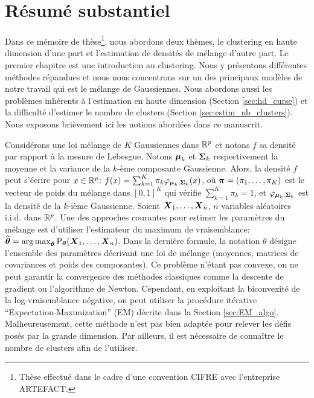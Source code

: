 \chapter*{Résumé substantiel}

Dans ce mémoire de thèse\footnote{Thèse effectué dans le cadre d'une convention CIFRE avec l'entreprise ARTEFACT.}, nous abordons deux thèmes, le clustering en haute dimension d'une part et l'estimation de densités de mélange d'autre part. Le premier chapitre est une introduction au clustering. Nous y présentons différentes méthodes répandues et nous nous concentrons sur un des principaux modèles de notre travail qui est le mélange de Gaussiennes. Nous abordons aussi les problèmes inhérents à l'estimation en haute dimension (Section \ref{sec:hd_curse}) et la difficulté d'estimer le nombre de clusters (Section \ref{sec:estim_nb_clusters}).  Nous exposons brièvement ici les notions abordées dans ce manuscrit.

Considérons une loi mélange de $K$ Gaussiennes dans ${\mathbb R}^p$ et notons $f$ sa densité par rapport à la mesure de Lebesgue. Notons $\boldsymbol\mu_k$ et $\boldsymbol\Sigma_k$ respectivement la moyenne et la variance de la $k$-ème composante Gaussienne. Alors, la densité $f$ peut s'écrire pour $x\in{\mathbb R}^p$: $f(x)= \sum_{k=1}^K\pi_k\varphi_{\boldsymbol\mu_k,\boldsymbol\Sigma_k}(x)$, où $\boldsymbol \pi=(\pi_1,\dots,\pi_K)$ est le vecteur de poids du mélange dans $[0,1]^K$ qui vérifie $\sum_{k=1}^K\pi_k=1$, et $\varphi_{\boldsymbol\mu_k,\boldsymbol\Sigma_k}$ est la densité de la $k$-ième Gaussienne. Soient $\boldsymbol X_1,\dots,\boldsymbol X_n$, $n$ variables aléatoires i.i.d. dans ${\mathbb R}^p$. Une des approches courantes pour estimer les paramètres du mélange est d'utiliser l'estimateur du maximum de vraisemblance: $\widehat{{\boldsymbol\theta}} = \operatorname*{arg\,max}_{{\boldsymbol\theta}}\textnormal{P}_{{\boldsymbol\theta}}(\boldsymbol X_1,\dots,\boldsymbol X_n)$. Dans la dernière formule, la notation $\theta$ désigne l'ensemble des paramètres décrivant une loi de mélange (moyennes, matrices de covariances et poids des composantes). Ce problème n'étant pas convexe, on ne peut garantir la convergence des méthodes classiques comme la descente de gradient ou l'algorithme de Newton. Cependant, en exploitant la biconvexité de la log-vraisemblance négative, on peut utiliser la procédure itérative ``Expectation-Maximization'' (EM) décrite dans la Section \ref{sec:EM_algo}. Malheureusement, cette méthode n'est pas bien adaptée pour relever les défis posés par la grande dimension. Par ailleurs, il est nécessaire de connaître le nombre de clusters afin de l'utiliser.

